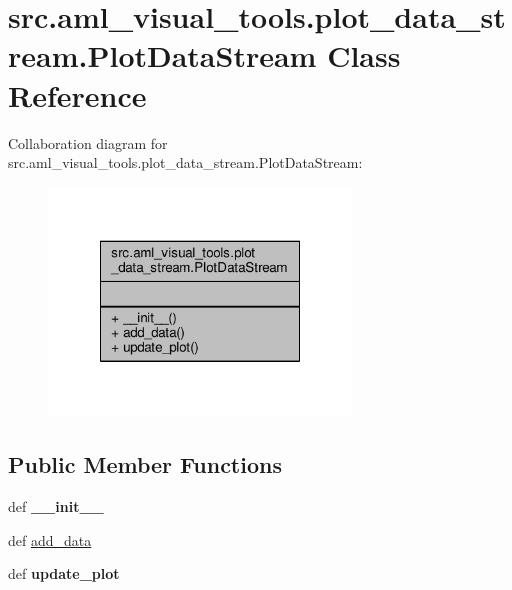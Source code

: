 \hypertarget{classsrc_1_1aml__visual__tools_1_1plot__data__stream_1_1_plot_data_stream}{\section{src.\-aml\-\_\-visual\-\_\-tools.\-plot\-\_\-data\-\_\-stream.\-Plot\-Data\-Stream Class Reference}
\label{classsrc_1_1aml__visual__tools_1_1plot__data__stream_1_1_plot_data_stream}
}


Collaboration diagram for src.\-aml\-\_\-visual\-\_\-tools.\-plot\-\_\-data\-\_\-stream.\-Plot\-Data\-Stream\-:
\nopagebreak
\begin{figure}[H]
\begin{center}
\leavevmode
\includegraphics[width=228pt]{classsrc_1_1aml__visual__tools_1_1plot__data__stream_1_1_plot_data_stream__coll__graph}
\end{center}
\end{figure}
\subsection*{Public Member Functions}
\begin{DoxyCompactItemize}
\item 
\hypertarget{classsrc_1_1aml__visual__tools_1_1plot__data__stream_1_1_plot_data_stream_a5a8eddd028d2ef54c2ffda12565dfb81}{def {\bfseries \-\_\-\-\_\-init\-\_\-\-\_\-}}\label{classsrc_1_1aml__visual__tools_1_1plot__data__stream_1_1_plot_data_stream_a5a8eddd028d2ef54c2ffda12565dfb81}

\item 
def \hyperlink{classsrc_1_1aml__visual__tools_1_1plot__data__stream_1_1_plot_data_stream_afd3e833ff80674b87adcebe22ecdbcf4}{add\-\_\-data}
\item 
\hypertarget{classsrc_1_1aml__visual__tools_1_1plot__data__stream_1_1_plot_data_stream_a8187452774cc48a6cf08c1786b10985a}{def {\bfseries update\-\_\-plot}}\label{classsrc_1_1aml__visual__tools_1_1plot__data__stream_1_1_plot_data_stream_a8187452774cc48a6cf08c1786b10985a}

\end{DoxyCompactItemize}


